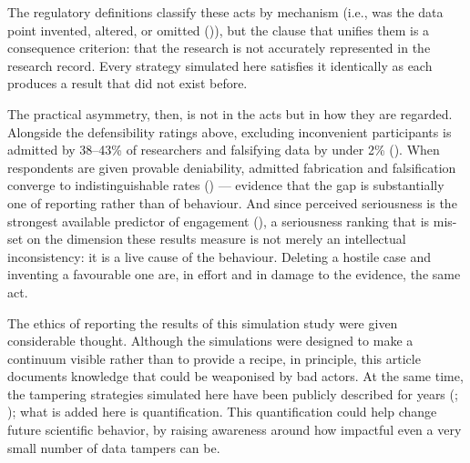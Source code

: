 \documentclass[
  nonatbib,
  authoryear,
  preprint]{elsarticle}
\begin{document}
The regulatory definitions classify these acts by mechanism (i.e., was
the data point invented, altered, or omitted
()), but the
clause that unifies them is a consequence criterion: that the research
is not accurately represented in the research record. Every strategy
simulated here satisfies it identically as each produces a result that
did not exist before.

The practical asymmetry, then, is not in the acts but in how they are
regarded. Alongside the defensibility ratings above, excluding
inconvenient participants is admitted by 38--43\% of researchers and
falsifying data by under 2\% (). When respondents are given provable deniability, admitted
fabrication and falsification converge to indistinguishable rates
() --- evidence that the gap is substantially one of reporting
rather than of behaviour. And since perceived seriousness is the
strongest available predictor of engagement
(), a
seriousness ranking that is mis-set on the dimension these results
measure is not merely an intellectual inconsistency: it is a live cause
of the behaviour. Deleting a hostile case and inventing a favourable one
are, in effort and in damage to the evidence, the same act.

The ethics of reporting the results of this simulation study were given
considerable thought. Although the simulations were designed to make a
continuum visible rather than to provide a recipe, in principle, this
article documents knowledge that could be weaponised by bad actors. At
the same time, the tampering strategies simulated here have been
publicly described for years (; ); what is
added here is quantification. This quantification could help change
future scientific behavior, by raising awareness around how impactful
even a very small number of data tampers can be.
\end{document}
